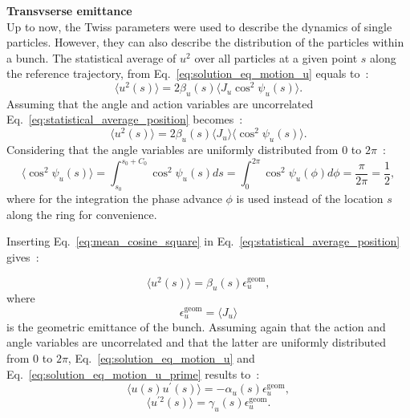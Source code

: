 \textbf{Transvserse emittance}\\
Up to now, the Twiss parameters were used to describe the dynamics of single particles. However, they can also describe the distribution of the particles within a bunch. The statistical average of $u^2$ over all particles at a given point $s$ along the reference trajectory, from Eq.~\eqref{eq:solution_eq_motion_u} equals to~\cite{wolski2014}:
 \begin{equation}\label{eq:statistical_average_position}
     \langle u^2(s) \rangle = 2 \beta_u(s) \langle J_u \cos^2{\psi_u(s)} \rangle.
 \end{equation}
 Assuming that the angle and action variables are uncorrelated Eq.~\eqref{eq:statistical_average_position} becomes~\cite{wolski2014}:
 \begin{equation}\label{eq:statistical_average_position_2}
     \langle u^2(s) \rangle = 2 \beta_u(s) \langle J_u \rangle \langle \cos^2{\psi_u(s)} \rangle.
 \end{equation}
 Considering that the angle variables are uniformly distributed from 0 to $2\pi$~\cite{wolski2014}: %
 \begin{equation}\label{eq:mean_cosine_square}
     \langle \cos^2{\psi_u(s)} \rangle = \int_{s_0}^{s_0+C_0} \cos^2{\psi_u(s)} ds =   \int_0^{2\pi} \cos^2{\psi_u(\phi)} d\phi = \frac{\pi}{2\pi} = \frac{1}{2},
 \end{equation}
 where for the integration the phase advance $\phi$ is used instead of the location $s$ along the ring for convenience. %
 
 Inserting Eq.~\eqref{eq:mean_cosine_square} in Eq.~\eqref{eq:statistical_average_position} gives~\cite{wolski2014}:
 
 \begin{equation}\label{eq:emittance_definition_1} %
     \langle u^2(s) \rangle = \beta_u(s)  \epsilon^{\mathrm{geom}}_u,
 \end{equation}
 where
 \begin{equation}\label{eq:geom_emittance_action}
     \epsilon^{\mathrm{geom}}_u=\langle J_u \rangle
 \end{equation}
 is the geometric emittance of the bunch. Assuming again that the action and angle variables are uncorrelated and that the latter are uniformly distributed from 0 to $2\pi$, Eq.~\eqref{eq:solution_eq_motion_u} and Eq.~\eqref{eq:solution_eq_motion_u_prime} results to~\cite{wolski2014}:
 \begin{equation}\label{eq:u_uprime_eq_1}
     \langle u(s) u^\prime(s) \rangle = - \alpha_u(s) \epsilon^{\mathrm{geom}}_u,
 \end{equation}
 \begin{equation}\label{eq:u_uprime_eq_2}
     \langle u^{\prime 2}(s) \rangle = \gamma_u(s) \epsilon^{\mathrm{geom}}_u.
 \end{equation}
 

